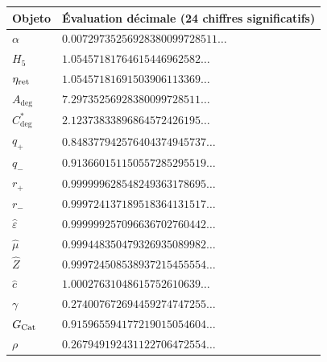 \begin{longtable}{@{}ll@{}}
\toprule
Objeto & Évaluation décimale (24 chiffres significatifs)\\
\midrule\endhead
$\alpha$ & $0.00729735256928380099728511\ldots$ \\
$H_5$ & $1.05457181764615446962582\ldots$ \\
$\eta_{\rm ret}$ & $1.05457181691503906113369\ldots$ \\
$A_{\deg}$ & $7.29735256928380099728511\ldots$ \\
$C^*_{\deg}$ & $2.12373833896864572426195\ldots$ \\
$q_+$ & $0.848377942576404374945737\ldots$ \\
$q_-$ & $0.913660151150557285295519\ldots$ \\
$r_+$ & $0.999999628548249363178695\ldots$ \\
$r_-$ & $0.999724137189518364131517\ldots$ \\
$\widehat\varepsilon$ & $0.999999257096636702760442\ldots$ \\
$\widehat\mu$ & $0.999448350479326935089982\ldots$ \\
$\widehat Z$ & $0.999724508538937215455554\ldots$ \\
$\widehat c$ & $1.00027631048615752610639\ldots$ \\
$\gamma$ & $0.274007672694459274747255\ldots$ \\
$G_{\rm Cat}$ & $0.915965594177219015054604\ldots$ \\
$\rho$ & $0.267949192431122706472554\ldots$ \\
\bottomrule
\end{longtable}
